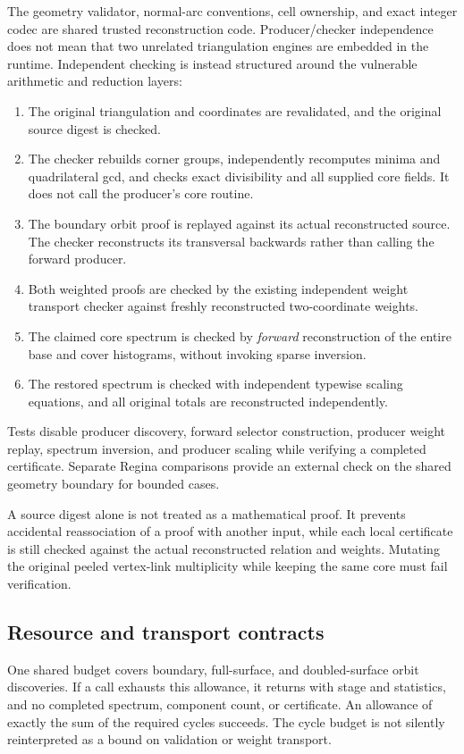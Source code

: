 The geometry validator, normal-arc conventions, cell ownership, and exact
integer codec are shared trusted reconstruction code. Producer/checker
independence does not mean that two unrelated triangulation engines are
embedded in the runtime. Independent checking is instead structured around
the vulnerable arithmetic and reduction layers:
\begin{enumerate}
\item The original triangulation and coordinates are revalidated, and the
original source digest is checked.
\item The checker rebuilds corner groups, independently recomputes minima
and quadrilateral gcd, and checks exact divisibility and all supplied core
fields. It does not call the producer's core routine.
\item The boundary orbit proof is replayed against its actual reconstructed
source. The checker reconstructs its transversal backwards rather than
calling the forward producer.
\item Both weighted proofs are checked by the existing independent weight
transport checker against freshly reconstructed two-coordinate weights.
\item The claimed core spectrum is checked by \emph{forward} reconstruction
of the entire base and cover histograms, without invoking sparse inversion.
\item The restored spectrum is checked with independent typewise scaling
equations, and all original totals are reconstructed independently.
\end{enumerate}
Tests disable producer discovery, forward selector construction, producer
weight replay, spectrum inversion, and producer scaling while verifying a
completed certificate. Separate Regina comparisons provide an external
check on the shared geometry boundary for bounded cases.

A source digest alone is not treated as a mathematical proof. It prevents
accidental reassociation of a proof with another input, while each local
certificate is still checked against the actual reconstructed relation and
weights. Mutating the original peeled vertex-link multiplicity while keeping
the same core must fail verification.

\subsection{Resource and transport contracts}

One shared  budget covers boundary, full-surface, and
doubled-surface orbit discoveries. If a call exhausts this allowance, it
returns  with stage and statistics, and no completed
spectrum, component count, or certificate. An allowance of exactly the
sum of the required cycles succeeds. The cycle budget is not silently
reinterpreted as a bound on validation or weight transport.

